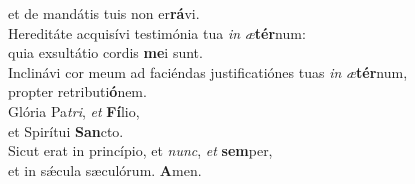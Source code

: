\evenverse et de mandátis tuis non er\textbf{rá}vi.\\
\oddverse Hereditáte acquisívi testimónia tua \textit{in} \textit{æ}\textbf{tér}num:~\*\\
\oddverse quia exsultátio cordis \textbf{me}i sunt.\\
\evenverse Inclinávi cor meum ad faciéndas justificatiónes tuas \textit{in} \textit{æ}\textbf{tér}num,~\*\\
\evenverse propter retributi\textbf{ó}nem.\\
\oddverse Glória Pa\textit{tri}, \textit{et} \textbf{Fí}lio,~\*\\
\oddverse et Spirítui \textbf{San}cto.\\
\evenverse Sicut erat in princípio, et \textit{nunc}, \textit{et} \textbf{sem}per,~\*\\
\evenverse et in sǽcula sæculórum. \textbf{A}men.\\
